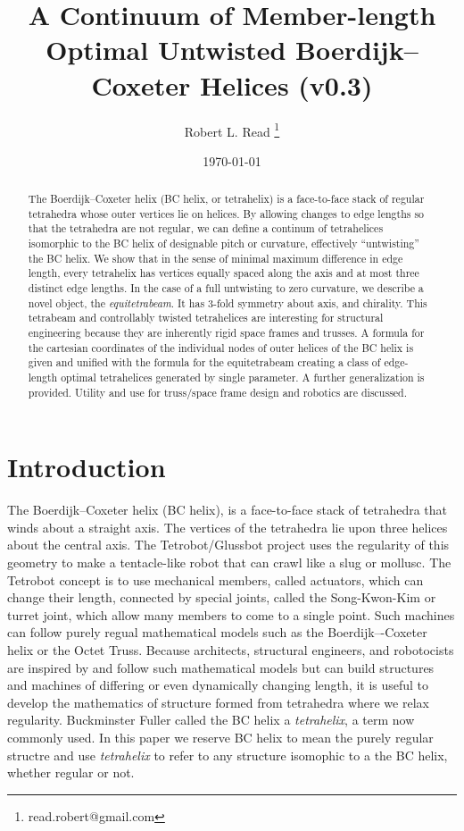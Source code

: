 \documentclass[11pt]{article}
\title{A Continuum of Member-length Optimal Untwisted Boerdijk--Coxeter Helices (v0.3)}
\author{Robert L. Read
  \thanks{read.robert@gmail.com}
}
\affil{Founder, Public Invention, an educational non-profit.}
\date{\today}
\begin{document}
\maketitle


\begin{abstract}
  The Boerdijk--Coxeter helix (BC helix, or tetrahelix) is a face-to-face stack of regular tetrahedra whose outer vertices lie on helices.
  By allowing changes to edge lengths so that the tetrahedra are not regular, we can define a continum of tetrahelices isomorphic to the
  BC helix of designable pitch or curvature, effectively ``untwisting'' the BC helix. We show that in the sense of minimal maximum
  difference in edge length, every tetrahelix has vertices equally spaced along the axis and at most three distinct edge lengths.
  In the case of a full untwisting to zero curvature, we describe a novel object, the
  \emph{equitetrabeam}.
  It has 3-fold symmetry about  axis, and chirality.  This tetrabeam and controllably twisted tetrahelices are
  interesting for structural engineering because they are inherently rigid space frames and trusses.
  A formula for the cartesian coordinates of the individual nodes of outer helices of the BC helix is given and
  unified with the formula for the equitetrabeam creating a class of edge-length optimal tetrahelices generated by single parameter.
  A further generalization is provided.
  Utility and use for truss/space frame design and robotics are discussed.
\end{abstract}


\section{Introduction}

The Boerdijk--Coxeter helix\cite{coxeter1985simplicial} (BC helix),
is a face-to-face stack of tetrahedra that winds about a straight axis.
The vertices of the tetrahedra
lie upon three
helices about the central axis.
The Tetrobot/Glussbot\cite{TetrobotBook} project
uses the regularity of this geometry to make a tentacle-like robot that can crawl like a slug or mollusc.
The Tetrobot concept
is to use mechanical members, called actuators, which can change their length, connected by special joints, called the Song-Kwon-Kim\cite{song2003spherical} or turret joint,
which allow many
members to come to a single point.
Such machines can follow purely regual mathematical models such as the Boerdijk–-Coxeter helix or the Octet Truss\cite{richard1961synergetic}.
Because architects, structural engineers, and robotocists are inspired by and follow such mathematical models but can build
structures and machines of differing or even dynamically changing length, it is useful to develop
the mathematics of structure formed from tetrahedra where we relax regularity. Buckminster Fuller called the BC helix a \emph{tetrahelix}\cite{fuller1982synergetics},
a term now commonly used. In this paper we reserve BC helix to mean the purely regular structre and use \emph{tetrahelix} to refer
to any structure isomophic to a the BC helix, whether regular or not.
\end{document}
